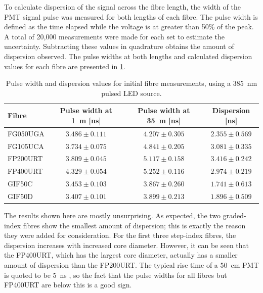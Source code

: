 \documentclass[a4paper,11pt]{article}
\begin{document}
To calculate dispersion of the signal across the fibre length, the width of the PMT signal pulse was measured for both lengths of each fibre. The pulse width is defined as the time elapsed while the voltage is at greater than 50\% of the peak. A total of 20,000 measurements were made for each set to estimate the uncertainty. Subtracting these values in quadrature obtains the amount of dispersion observed. The pulse widths at both lengths and calculated dispersion values for each fibre are presented in \cref{tab:dispinit}.
\begin{table}[h]
\centering
\begin{tabular}{lccc}
\hline
Fibre	   & Pulse width at 1~m [ns]  & Pulse width at 35~m [ns] &  Dispersion [ns]		\\ \hline
FG050UGA   &  $3.486\pm0.111$	      &  $4.207\pm0.305$         &  $2.355\pm0.569$     \\
FG105UCA   &  $3.734\pm0.075$	      &  $4.841\pm0.205$ 		 &  $3.081\pm0.335$     \\
FP200URT   &  $3.809\pm0.045$	      &  $5.117\pm0.158$	   	 &  $3.416\pm0.242$     \\
FP400URT   &  $4.329\pm0.054$	      &  $5.252\pm0.116$ 		 &  $2.974\pm0.219$     \\
GIF50C     &  $3.453\pm0.103$    	  &  $3.867\pm0.260$ 	     &  $1.741\pm0.613$     \\
GIF50D     &  $3.407\pm0.101$		  &  $3.899\pm0.213$ 		 &  $1.896\pm0.509$     \\ \hline
\end{tabular}
\caption{Pulse width and dispersion values for initial fibre measurements, using a 385~nm pulsed LED source.}\label{tab:dispinit}
\end{table}
The results shown here are mostly unsurprising. As expected, the two graded-index fibres show the smallest amount of dispersion; this is exactly the reason they were added for consideration. For the first three step-index fibres, the dispersion increases with increased core diameter. However, it can be seen that the FP400URT, which has the largest core diameter, actually has a smaller amount of dispersion than the FP200URT. The typical rise time of a 50~cm PMT is quoted to be 5~ns \cite{bib:hkpmt}, so the fact that the pulse widths for all fibres but FP400URT are below this is a good sign.
\end{document}
